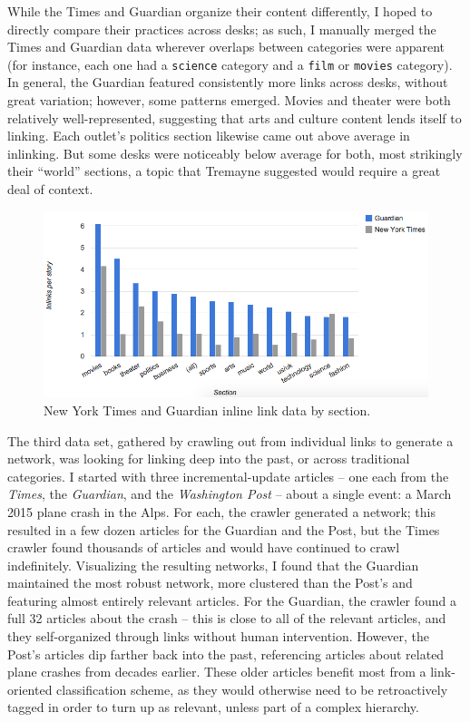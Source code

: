 While the Times and Guardian organize their content differently, I hoped to directly compare their practices across desks; as such, I manually merged the Times and Guardian data wherever overlaps between categories were apparent (for instance, each one had a \texttt{science} category and a \texttt{film} or \texttt{movies} category). In general, the Guardian featured consistently more links across desks, without great variation; however, some patterns emerged. Movies and theater were both relatively well-represented, suggesting that arts and culture content lends itself to linking. Each outlet's politics section likewise came out above average in inlinking. But some desks were noticeably below average for both, most strikingly their ``world'' sections, a topic that Tremayne suggested would require a great deal of context.

\begin{figure}[ht]
\centering
\includegraphics[width=450pt]{figures/nytvguardian-sections}
\caption{New York Times and Guardian inline link data by section.}
\label{fig:nytvguardian-sections}
\end{figure}

The third data set, gathered by crawling out from individual links to generate a network, was looking for linking deep into the past, or across traditional categories. I started with three incremental-update articles -- one each from the \emph{Times}, the \emph{Guardian}, and the \emph{Washington Post} -- about a single event: a March 2015 plane crash in the Alps. For each, the crawler generated a network; this resulted in a few dozen articles for the Guardian and the Post, but the Times crawler found thousands of articles and would have continued to crawl indefinitely. Visualizing the resulting networks, I found that the Guardian maintained the most robust network, more clustered than the Post's and featuring almost entirely relevant articles. For the Guardian, the crawler found a full 32 articles about the crash -- this is close to all of the relevant articles, and they self-organized through links without human intervention. However, the Post's articles dip farther back into the past, referencing articles about related plane crashes from decades earlier. These older articles benefit most from a link-oriented classification scheme, as they would otherwise need to be retroactively tagged in order to turn up as relevant, unless part of a complex hierarchy.

